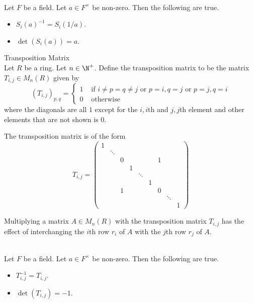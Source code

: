 \documentclass[a4paper]{article}
\begin{document}
\begin{lmm}{}{}\\
Let $F$ be a field. Let $a\in F^\times$ be non-zero. Then the following are true. 
\begin{itemize}
\item $S_i(a)^{-1}=S_i(1/a)$. 
\item $\det(S_i(a))=a$. 
\end{itemize}
\end{lmm}

\begin{defn}{Transposition Matrix}{}\\
Let $R$ be a ring. Let $n\in\N^+$. Define the transposition matrix to be the matrix $T_{i,j}\in M_n(R)$ given by $$\left(T_{i,j}\right)_{p,q}=\begin{cases}
1 & \text{ if }i\neq p=q\neq j\text{ or }p=i,q=j\text{ or }p=j,q=i\\
0 & \text{ otherwise }
\end{cases}$$ where the diagonals are all $1$ except for the $i,i$th and $j,j$th element and other elements that are not shown is $0$.
\end{defn}

The transposition matrix is of the form $$T_{i,j}=
\begin{pmatrix}
1&&&&&&&&\\
&\ddots&&&&&&&\\
&&0&&&&1&&\\
&&&1&&&&&\\
&&&&\ddots&&&&\\
&&&&&1&&&\\
&&1&&&&0&&\\
&&&&&&&\ddots&\\
&&&&&&&&1
\end{pmatrix}$$

Multiplying a matrix $A\in M_n(R)$ with the transposition matrix $T_{i,j}$ has the effect of interchanging the $i$th row $r_i$ of $A$ with the $j$th row $r_j$ of $A$. 

\begin{lmm}{}{}\\
Let $F$ be a field. Let $a\in F^\times$ be non-zero. Then the following are true. 
\begin{itemize}
\item $T_{i,j}^{-1}=T_{i,j}$. 
\item $\det(T_{i,j})=-1$. 
\end{itemize}
\end{lmm}
\end{document}

